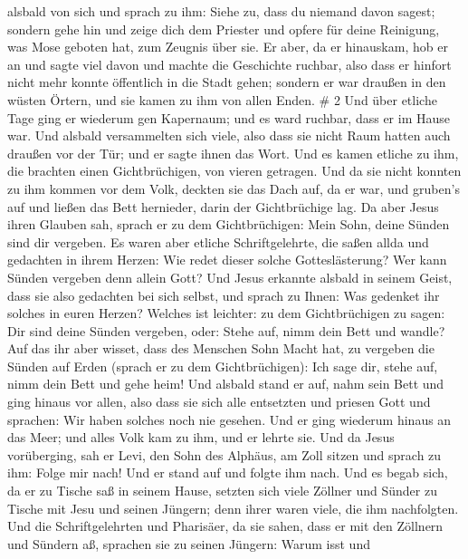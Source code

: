 alsbald von sich  und sprach zu ihm: Siehe zu, dass du
niemand davon sagest; sondern gehe hin und zeige dich dem Priester und
opfere für deine Reinigung, was Mose geboten hat, zum Zeugnis über sie.
 Er aber, da er hinauskam, hob er an und sagte viel davon
und machte die Geschichte ruchbar, also dass er hinfort nicht mehr
konnte öffentlich in die Stadt gehen; sondern er war draußen in den
wüsten Örtern, und sie kamen zu ihm von allen Enden. \# 2 
Und über etliche Tage ging er wiederum gen Kapernaum; und es ward
ruchbar, dass er im Hause war.  Und alsbald versammelten
sich viele, also dass sie nicht Raum hatten auch draußen vor der Tür;
und er sagte ihnen das Wort.  Und es kamen etliche zu ihm,
die brachten einen Gichtbrüchigen, von vieren getragen.  Und
da sie nicht konnten zu ihm kommen vor dem Volk, deckten sie das Dach
auf, da er war, und gruben's auf und ließen das Bett hernieder, darin
der Gichtbrüchige lag.  Da aber Jesus ihren Glauben sah,
sprach er zu dem Gichtbrüchigen: Mein Sohn, deine Sünden sind dir
vergeben.  Es waren aber etliche Schriftgelehrte, die saßen
allda und gedachten in ihrem Herzen:  Wie redet dieser
solche Gotteslästerung? Wer kann Sünden vergeben denn allein Gott?
 Und Jesus erkannte alsbald in seinem Geist, dass sie also
gedachten bei sich selbst, und sprach zu Ihnen: Was gedenket ihr solches
in euren Herzen?  Welches ist leichter: zu dem
Gichtbrüchigen zu sagen: Dir sind deine Sünden vergeben, oder: Stehe
auf, nimm dein Bett und wandle?  Auf das ihr aber wisset,
dass des Menschen Sohn Macht hat, zu vergeben die Sünden auf Erden
(sprach er zu dem Gichtbrüchigen):  Ich sage dir, stehe
auf, nimm dein Bett und gehe heim!  Und alsbald stand er
auf, nahm sein Bett und ging hinaus vor allen, also dass sie sich alle
entsetzten und priesen Gott und sprachen: Wir haben solches noch nie
gesehen.  Und er ging wiederum hinaus an das Meer; und
alles Volk kam zu ihm, und er lehrte sie.  Und da Jesus
vorüberging, sah er Levi, den Sohn des Alphäus, am Zoll sitzen und
sprach zu ihm: Folge mir nach! Und er stand auf und folgte ihm nach.
 Und es begab sich, da er zu Tische saß in seinem Hause,
setzten sich viele Zöllner und Sünder zu Tische mit Jesu und seinen
Jüngern; denn ihrer waren viele, die ihm nachfolgten.  Und
die Schriftgelehrten und Pharisäer, da sie sahen, dass er mit den
Zöllnern und Sündern aß, sprachen sie zu seinen Jüngern: Warum isst und

